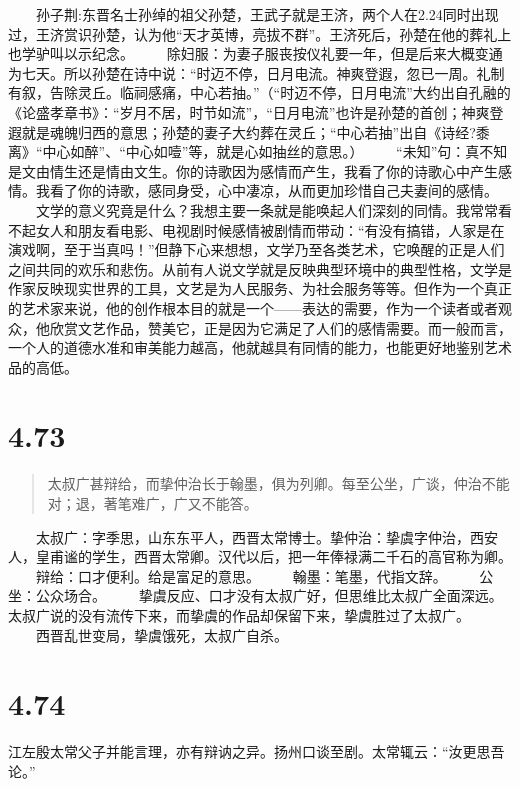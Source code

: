 \documentclass[]{book}
\begin{document}
　　孙子荆:东晋名士孙绰的祖父孙楚，王武子就是王济，两个人在2.24同时出现过，王济赏识孙楚，认为他``天才英博，亮拔不群''。王济死后，孙楚在他的葬礼上也学驴叫以示纪念。
　　除妇服：为妻子服丧按仪礼要一年，但是后来大概变通为七天。所以孙楚在诗中说：``时迈不停，日月电流。神爽登遐，忽已一周。礼制有叙，告除灵丘。临祠感痛，中心若抽。''（``时迈不停，日月电流''大约出自孔融的《论盛孝章书》：``岁月不居，时节如流''，``日月电流''也许是孙楚的首创；神爽登遐就是魂魄归西的意思；孙楚的妻子大约葬在灵丘；``中心若抽''出自《诗经?黍离》``中心如醉''、``中心如噎''等，就是心如抽丝的意思。）
　　``未知''句：真不知是文由情生还是情由文生。你的诗歌因为感情而产生，我看了你的诗歌心中产生感情。我看了你的诗歌，感同身受，心中凄凉，从而更加珍惜自己夫妻间的感情。
　　文学的意义究竟是什么？我想主要一条就是能唤起人们深刻的同情。我常常看不起女人和朋友看电影、电视剧时候感情被剧情而带动：``有没有搞错，人家是在演戏啊，至于当真吗！''但静下心来想想，文学乃至各类艺术，它唤醒的正是人们之间共同的欢乐和悲伤。从前有人说文学就是反映典型环境中的典型性格，文学是作家反映现实世界的工具，文艺是为人民服务、为社会服务等等。但作为一个真正的艺术家来说，他的创作根本目的就是一个------表达的需要，作为一个读者或者观众，他欣赏文艺作品，赞美它，正是因为它满足了人们的感情需要。而一般而言，一个人的道德水准和审美能力越高，他就越具有同情的能力，也能更好地鉴别艺术品的高低。

\section{4.73}\label{section-250}

\begin{quote}
太叔广甚辩给，而挚仲治长于翰墨，俱为列卿。每至公坐，广谈，仲治不能对；退，著笔难广，广又不能答。
\end{quote}

　　太叔广：字季思，山东东平人，西晋太常博士。挚仲治：挚虞字仲治，西安人，皇甫谧的学生，西晋太常卿。汉代以后，把一年俸禄满二千石的高官称为卿。
　　辩给：口才便利。给是富足的意思。 　　翰墨：笔墨，代指文辞。
　　公坐：公众场合。
　　挚虞反应、口才没有太叔广好，但思维比太叔广全面深远。太叔广说的没有流传下来，而挚虞的作品却保留下来，挚虞胜过了太叔广。
　　西晋乱世变局，挚虞饿死，太叔广自杀。

\section{4.74}\label{section-251}

江左殷太常父子并能言理，亦有辩讷之异。扬州口谈至剧。太常辄云：``汝更思吾论。''
\end{document}

